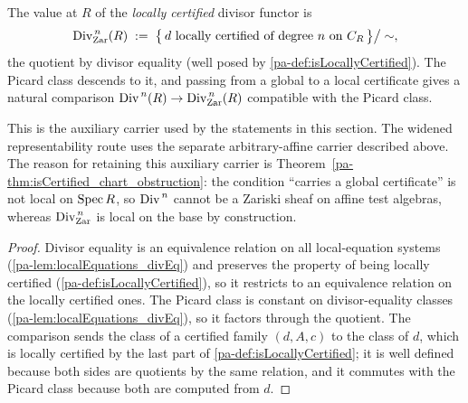 \begin{definition}
  \label{pa-def:divFamZar}
  \leanok

  The value at \(R\) of the \emph{locally certified} divisor functor is
  \[
    \operatorname{Div}^{\,n}_{\mathrm{Zar}}(R) \;:=\;
      \bigl\{\, d \text{ locally certified of degree } n \text{ on } C_R \,\bigr\} \big/ \sim ,
  \]
  the quotient by divisor equality (well posed by \ref{pa-def:isLocallyCertified}). The Picard
  class descends to it, and passing from a global to a local certificate gives a natural
  comparison \(\operatorname{Div}^{\,n}(R) \to \operatorname{Div}^{\,n}_{\mathrm{Zar}}(R)\) compatible with the Picard
  class.

  This is the auxiliary carrier used by the statements in this section. The widened
  representability route uses the separate arbitrary-affine carrier described above. The reason
  for retaining this auxiliary carrier is
  Theorem~\ref{pa-thm:isCertified_chart_obstruction}: the condition ``carries a global
  certificate'' is not local on \(\operatorname{Spec} R\), so \(\operatorname{Div}^{\,n}\) cannot be a Zariski sheaf on
  affine test algebras, whereas \(\operatorname{Div}^{\,n}_{\mathrm{Zar}}\) is local on the base by
  construction.
\end{definition}
\begin{proof}
  \leanok
  Divisor equality is an equivalence relation on all local-equation systems
  (\ref{pa-lem:localEquations_divEq}) and preserves the property of being locally certified
  (\ref{pa-def:isLocallyCertified}), so it restricts to an equivalence relation on the locally
  certified ones. The Picard class is constant on divisor-equality classes
  (\ref{pa-lem:localEquations_divEq}), so it factors through the quotient. The comparison
  sends the class of a certified family \((d,A,c)\) to the class of \(d\), which is locally
  certified by the last part of \ref{pa-def:isLocallyCertified}; it is well defined because
  both sides are quotients by the same relation, and it commutes with the Picard class
  because both are computed from \(d\).
\end{proof}

